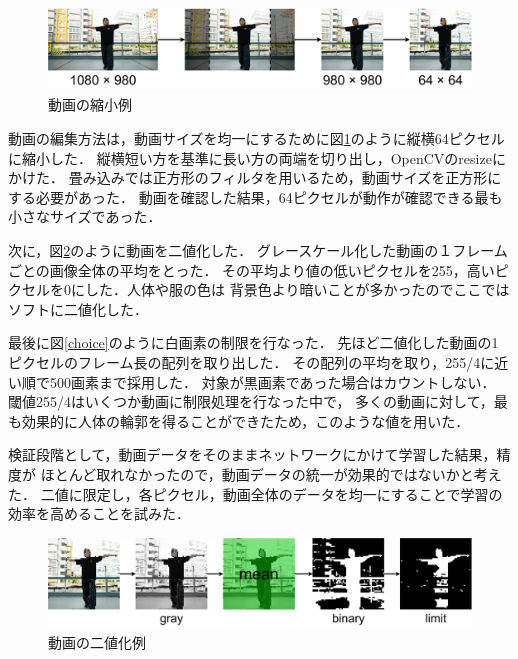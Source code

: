 \begin{figure}[t]
  \begin{center}
    \includegraphics[width=120mm]{images/chart/resize.pdf}
  \end{center}
  \caption{動画の縮小例}
  \label{resize}
\end{figure}

動画の編集方法は，動画サイズを均一にするために図\ref{resize}のように縦横64ピクセルに縮小した．
縦横短い方を基準に長い方の両端を切り出し，OpenCVのresize\cite{resize}にかけた．
畳み込みでは正方形のフィルタを用いるため，動画サイズを正方形にする必要があった．
動画を確認した結果，64ピクセルが動作が確認できる最も小さなサイズであった．

次に，図\ref{binary}のように動画を二値化した．
グレースケール化した動画の１フレームごとの画像全体の平均をとった．
その平均より値の低いピクセルを255，高いピクセルを0にした．人体や服の色は
背景色より暗いことが多かったのでここではソフトに二値化した．

最後に図\ref{choice}のように白画素の制限を行なった．
先ほど二値化した動画の1ピクセルのフレーム長の配列を取り出した．
その配列の平均を取り，255/4に近い順で500画素まで採用した．
対象が黒画素であった場合はカウントしない．
閾値255/4はいくつか動画に制限処理を行なった中で，
多くの動画に対して，最も効果的に人体の輪郭を得ることができたため，このような値を用いた．

検証段階として，動画データをそのままネットワークにかけて学習した結果，精度が
ほとんど取れなかったので，動画データの統一が効果的ではないかと考えた．
二値に限定し，各ピクセル，動画全体のデータを均一にすることで学習の効率を高めることを試みた．

\begin{figure}[b]
  \begin{center}
    \includegraphics[width=120mm]{images/chart/binary.pdf}
  \end{center}
  \caption{動画の二値化例}
  \label{binary}
\end{figure}
\clearpage

